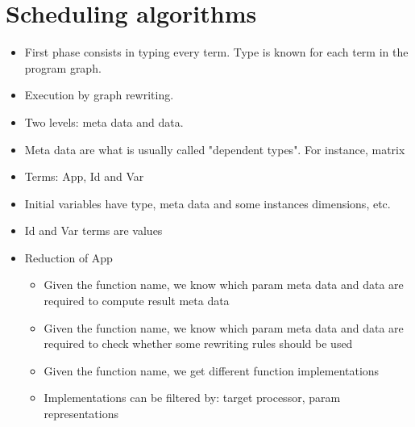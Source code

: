 \chapter{Scheduling algorithms}

\begin{itemize}
  \item First phase consists in typing every term. Type is known for each term in the
program graph.
  \item Execution by graph rewriting.
  \item Two levels: meta data and data.
  \item Meta data are what is usually called "dependent types". For instance, matrix
  \item Terms: App, Id and Var
  \item Initial variables have type, meta data and some instances
dimensions, etc.
  \item Id and Var terms are values
  \item Reduction of App
  \begin{itemize}
    \item Given the function name, we know which param meta data and data are
    required to compute result meta data
    \item Given the function name, we know which param meta data and data are
    required to check whether some rewriting rules should be used
    \item Given the function name, we get different function implementations
    \item Implementations can be filtered by: target processor, param
    representations
  \end{itemize}
\end{itemize}

